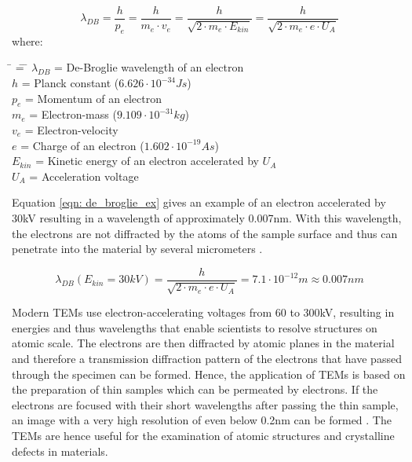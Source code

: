 \begin{equation}
    \lambda_{DB} = \frac{h}{p_{e}} = \frac{h}{m_{e} \cdot v_{e}} = 
    \frac{h}{\sqrt{2 \cdot m_{e} \cdot E_{kin}}} =
    \frac{h}{\sqrt{2 \cdot m_{e} \cdot e \cdot U_{A}}}
\label{eqn: de_broglie}
\end{equation}
where:
\begin{tabbing}
\hspace{2em} \= \hspace{3em} \=  = \= \kill
\> $\lambda_{DB}$ \> = De-Broglie wavelength of an electron\\
\> $h$ \> = Planck constant ($6.626 \cdot 10^{-34} Js$)\\
\> $p_{e}$ \> = Momentum of an electron\\
\> $m_{e}$ \> = Electron-mass ($9.109 \cdot 10^{-31}kg$)\\
\> $v_{e}$ \> = Electron-velocity\\
\> $e$ \> = Charge of an electron ($1.602 \cdot 10^{-19}As$)\\
\> $E_{kin}$ \> = Kinetic energy of an electron accelerated by $U_{A}$\\
\> $U_{A}$ \> = Acceleration voltage\\
\end{tabbing}

Equation \ref{eqn: de_broglie_ex} gives an example of an electron accelerated by 30kV resulting in a wavelength of approximately 0.007nm. With this wavelength, the electrons are not diffracted by the atoms of the sample surface and thus can penetrate into the material by several micrometers \cite[p.10]{EGERTON_2016}.

\begin{equation}
    \lambda_{DB}(E_{kin}=30kV) = \frac{h}{\sqrt{2 \cdot m_{e} \cdot e \cdot U_{A}}} = 7.1 \cdot 10^{-12}m \approx 0.007nm
\label{eqn: de_broglie_ex}
\end{equation}

Modern \acfp{TEM} use electron-accelerating voltages from 60 to 300kV, resulting in energies and thus wavelengths that enable scientists to resolve structures on atomic scale. The electrons are then diffracted by atomic planes in the material and therefore a transmission diffraction pattern of the electrons that have passed through the specimen can be formed. Hence, the application of \acp{TEM} is based on the preparation of thin samples which can be permeated by electrons. If the electrons are focused with their short wavelengths after passing the thin sample, an image with a very high resolution of even below 0.2nm can be formed \cite[p.10]{EGERTON_2016}. The \acp{TEM} are hence useful for the examination of atomic structures and crystalline defects in materials.\\


